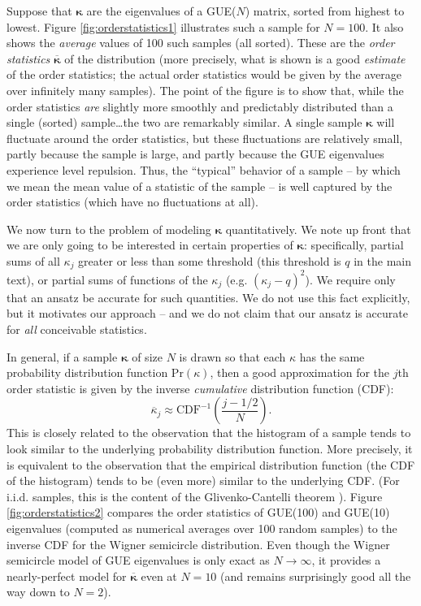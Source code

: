 \documentclass[aps,pra, twocolumn]{revtex4}
\newcommand{\bvec}[1]{\boldsymbol{#1}}
\begin{document}
Suppose that $\bvec{\kappa}$ are the eigenvalues of a GUE($N$) matrix, sorted from highest to lowest.  Figure \ref{fig:orderstatistics1} illustrates such a sample for $N=100$.  It also shows the \emph{average} values of 100 such samples (all sorted).  These are the \emph{order statistics} $\overline{\bvec{\kappa}}$ of the distribution (more precisely, what is shown is a good \emph{estimate} of the order statistics; the actual order statistics would be given by the average over infinitely many samples).  The point of the figure is to show that, while the order statistics \emph{are} slightly more smoothly and predictably distributed than a single (sorted) sample\ldots the two are remarkably similar.  A single sample $\bvec{\kappa}$ will fluctuate around the order statistics, but these fluctuations are relatively small, partly because the sample is large, and partly because the GUE eigenvalues experience level repulsion.  Thus, the ``typical'' behavior of a sample -- by which we mean the mean value of a statistic of the sample -- is well captured by the order statistics (which have no fluctuations at all).

We now turn to the problem of modeling $\bvec{\kappa}$ quantitatively.  We note up front that we are only going to be interested in certain properties of $\bvec{\kappa}$:  specifically, partial sums of all $\kappa_j$ greater or less than some threshold (this threshold is $q$ in the main text), or partial sums of functions of the $\kappa_j$ (e.g. $(\kappa_j-q)^2$).  We require only that an ansatz be accurate for such quantities.  We do not use this fact explicitly, but it motivates our approach -- and we do not claim that our ansatz is accurate for \emph{all} conceivable statistics.

In general, if a sample $\bvec{\kappa}$ of size $N$ is drawn so that each $\kappa$ has the same probability distribution 
function $\mathrm{Pr}(\kappa)$, then a good approximation for the $j$th order statistic is given by the inverse 
\emph{cumulative} distribution function (CDF):
\begin{equation}
\overline{\kappa}_j \approx \mathrm{CDF}^{-1}\left(\frac{j-1/2}{N}\right).
\end{equation}
This is closely related to the observation that the histogram of a sample tends to look similar to the underlying probability distribution function.  More precisely, it is equivalent to the observation that the empirical distribution function (the CDF of the histogram) tends to be (even more) similar to the underlying CDF.  (For i.i.d. samples, this is the content of the Glivenko-Cantelli theorem \cite{VanderVaart2000}).  Figure \ref{fig:orderstatistics2} compares the order statistics of GUE(100) and GUE(10) eigenvalues (computed as numerical averages over 100 random samples) to the inverse CDF for the Wigner semicircle distribution.  Even though the Wigner semicircle model of GUE eigenvalues is only exact as $N\to\infty$, it provides a nearly-perfect model for $\overline{\bvec{\kappa}}$ even at $N=10$ (and remains surprisingly good all the way down to $N=2$).
\end{document}
